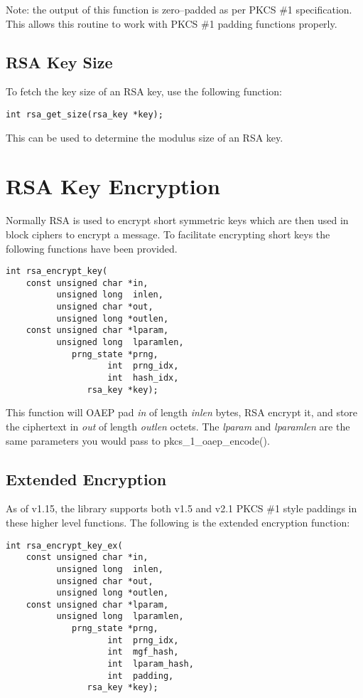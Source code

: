 \documentclass[synpaper]{book}
\newcommand{\mysection}[1]    %
	{                   %
	\section{#1}
   \markboth{\textsf{www.libtom.net}}{\thesection ~ {#1}}
	}
\begin{document}
Note: the output of this function is zero--padded as per PKCS \#1 specification.  This allows this routine to work with PKCS \#1 padding functions properly.

\subsection{RSA Key Size}
To fetch the key size of an RSA key, use the following function:
\begin{verbatim}
int rsa_get_size(rsa_key *key);
\end{verbatim}
This can be used to determine the modulus size of an RSA key.

\mysection{RSA Key Encryption}
Normally RSA is used to encrypt short symmetric keys which are then used in block ciphers to encrypt a message.
To facilitate encrypting short keys the following functions have been provided.

\begin{verbatim}
int rsa_encrypt_key(
    const unsigned char *in,
          unsigned long  inlen,
          unsigned char *out,
          unsigned long *outlen,
    const unsigned char *lparam,
          unsigned long  lparamlen,
             prng_state *prng,
                    int  prng_idx,
                    int  hash_idx,
                rsa_key *key);
\end{verbatim}
This function will OAEP pad \textit{in} of length \textit{inlen} bytes, RSA encrypt it, and store the ciphertext
in \textit{out} of length \textit{outlen} octets.  The \textit{lparam} and \textit{lparamlen} are the same parameters you would pass
to  pkcs\_1\_oaep\_encode().

\subsection{Extended Encryption}
As of v1.15, the library supports both v1.5 and v2.1 PKCS \#1 style paddings in these higher level functions.  The following is the extended
encryption function:

\begin{verbatim}
int rsa_encrypt_key_ex(
    const unsigned char *in,
          unsigned long  inlen,
          unsigned char *out,
          unsigned long *outlen,
    const unsigned char *lparam,
          unsigned long  lparamlen,
             prng_state *prng,
                    int  prng_idx,
                    int  mgf_hash,
                    int  lparam_hash,
                    int  padding,
                rsa_key *key);
\end{verbatim}
\end{document}
